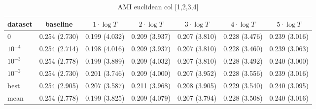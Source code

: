     \begin{table}[ht]
    \caption{AMI euclidean col [1,2,3,4]} 
    \begin{adjustbox}{width=\textwidth}
    \begin{tabular}{lcccccc}
    \hline
    dataset & baseline & \textbf{$1\cdot \log{T}$} & \textbf{$2\cdot \log{T}$} & \textbf{$3\cdot \log{T}$} & \textbf{$4\cdot \log{T}$} & \textbf{$5\cdot \log{T}$} \\ \hline
    $0$ & 0.254 (2.730) & 0.199 (4.032) & 0.209 (3.937) & 0.207 (3.810) & 0.228 (3.476) & 0.239 (3.016) \\ 
    $10^{-4}$ & 0.254 (2.714) & 0.198 (4.016) & 0.209 (3.937) & 0.207 (3.810) & 0.228 (3.460) & 0.239 (3.063) \\ 
    $10^{-3}$ & 0.254 (2.778) & 0.199 (3.889) & 0.209 (4.032) & 0.207 (3.810) & 0.228 (3.492) & 0.240 (3.000) \\ 
    $10^{-2}$ & 0.254 (2.730) & 0.201 (3.746) & 0.209 (4.000) & 0.207 (3.952) & 0.228 (3.556) & 0.239 (3.016) \\ 
    best & 0.254 (2.905) & 0.207 (3.587) & 0.211 (3.968) & 0.208 (3.905) & 0.229 (3.540) & 0.240 (3.095) \\ 
    mean & 0.254 (2.778) & 0.199 (3.825) & 0.209 (4.079) & 0.207 (3.794) & 0.228 (3.508) & 0.240 (3.016) \\ 
    \hline
    \end{tabular}
    \end{adjustbox}
    \end{table}
    